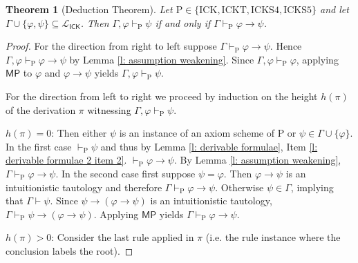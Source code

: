 \documentclass{myifcolog}
\newcommand{\ICK}{\mathsf{ICK}}
\newcommand{\LICK}{\mathcal{L}_{\ICK}}
\newcommand{\hick}{\mathrm{ICK}}
\newcommand{\hickt}{\mathrm{ICKT}}
\newcommand{\hicks}{\mathrm{ICKS4}}
\newcommand{\hickss}{\mathrm{ICKS5}}
\newcommand{\hickp}{\mathrm{P}}
\newtheorem{theorem}{Theorem}
\numberwithin{theorem}{section}
\begin{document}
\begin{theorem}[Deduction Theorem]\label{t: deduction theorem for IM}
    Let $\hickp \in \{\hick, \hickt, \hicks, \hickss\}$ and let $\Gamma \cup \{\varphi, \psi\} \subseteq \LICK$. Then $\Gamma, \varphi \vdash_\mathrm{P} \psi$ if and only if $\Gamma \vdash_\mathrm{P} \varphi \rightarrow \psi$.
\end{theorem}
\begin{proof}
    For the direction from right to left suppose $\Gamma \vdash_\mathrm{P} \varphi \rightarrow \psi$. Hence $\Gamma, \varphi \vdash_\mathrm{P} \varphi \rightarrow \psi$ by Lemma \ref{l: assumption weakening}. Since $\Gamma, \varphi \vdash_\mathrm{P} \varphi$, applying $\mathsf{MP}$ to $\varphi$ and $\varphi \rightarrow \psi$ yields $\Gamma, \varphi \vdash_\mathrm{P} \psi$. \smallskip
    
    For the direction from left to right we proceed by induction on the height $h(\pi)$ of the derivation $\pi$ witnessing $\Gamma, \varphi \vdash_\mathrm{P} \psi$. \smallskip 
    
    \noindent \textsc{$h(\pi) = 0$}: Then either $\psi$ is an instance of an axiom scheme of $\mathrm{P}$ or $\psi \in \Gamma \cup \{\varphi\}$. In the first case $\vdash_\mathrm{P} \psi$ and thus by Lemma \ref{l: derivable formulae}, Item \ref{l: derivable formulae 2 item 2}. $\vdash_\mathrm{P} \varphi \rightarrow \psi$. By Lemma \ref{l: assumption weakening}, $\Gamma \vdash_\mathrm{P} \varphi \rightarrow \psi$. In the second case first suppose $\psi = \varphi$. Then $ \varphi \rightarrow \psi$ is an intuitionistic tautology and therefore $\Gamma \vdash_\mathrm{P} \varphi \rightarrow \psi$. Otherwise $\psi \in \Gamma$, implying that $\Gamma \vdash \psi$. Since $\psi \rightarrow (\varphi \rightarrow \psi)$ is an intuitionistic tautology, $\Gamma \vdash_\mathrm{P} \psi \rightarrow (\varphi \rightarrow \psi)$. Applying $\mathsf{MP}$ yields $\Gamma \vdash_\mathrm{P} \varphi \rightarrow \psi$. \smallskip 
    
   \noindent $h(\pi) > 0$: Consider the last rule applied in $\pi$ (i.e. the rule instance where the conclusion labels the root). \smallskip
    

\end{proof}
\end{document}
